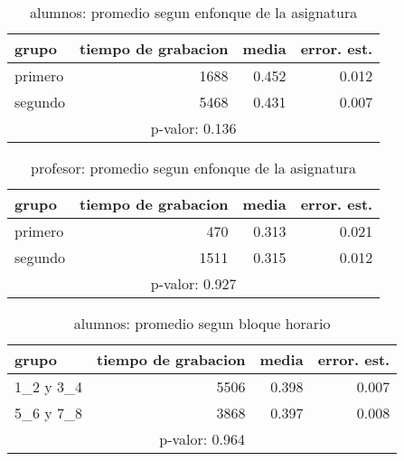 \documentclass[spanish]{article}
\begin{document}
\begin{table}[h!]
\begin{center}
\begin{tabular}{|l|r|r|r|}
\hline
grupo   & tiempo de grabacion & media          & error. est.     \\ \hline
primero &                1688 &          0.452 &            0.012\\ \hline
segundo &                5468 &          0.431 &            0.007\\ \hline
\multicolumn{4}{|c|}{p-valor: 0.136} \\ \hline
\end{tabular}
\caption{alumnos: promedio segun enfonque de la asignatura}
\end{center}
\end{table}

\begin{table}[h!]
\begin{center}
\begin{tabular}{|l|r|r|r|}
\hline
grupo   & tiempo de grabacion & media          & error. est.    \\ \hline
primero &                 470 &          0.313 &           0.021\\ \hline
segundo &                1511 &          0.315 &           0.012\\ \hline
\multicolumn{4}{|c|}{p-valor: 0.927} \\ \hline
\end{tabular}
\caption{profesor: promedio segun enfonque de la asignatura}
\end{center}
\end{table}

\begin{table}[h!]
\begin{center}
\begin{tabular}{|l|r|r|r|}
\hline
grupo     & tiempo de grabacion & media          & error. est.     \\ \hline
1\_2 y 3\_4 &                5506 &          0.398 &            0.007\\ \hline
5\_6 y 7\_8 &                3868 &          0.397 &            0.008\\ \hline
\multicolumn{4}{|c|}{p-valor: 0.964} \\ \hline
\end{tabular}
\caption{alumnos: promedio segun bloque horario}
\end{center}
\end{table}
\end{document}

